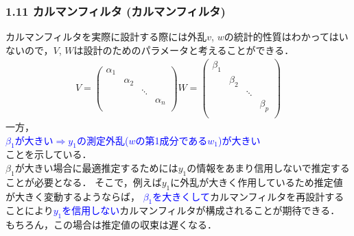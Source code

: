 \documentclass[10pt]{beamer}
\begin{document}
\begin{frame}[t]
\frametitle{1.11 カルマンフィルタ (カルマンフィルタ)}
\addtocounter{equation}{-1}
カルマンフィルタを実際に設計する際には外乱$v$, $w$の統計的性質はわかってはいないので，$V$, $W$は設計のためのパラメータと考えることができる．
\begin{align}
  V =    \left(
      \begin{array}{cccc}
        \alpha_1 & & & \\
        & \alpha_2 & & \\
        & & \ddots & \\
        & & & \alpha_n \\
      \end{array}
    \right)
 
  W =    \left(
      \begin{array}{cccc}
        \beta_1 & & & \\
        & \beta_2 & & \\
        & & \ddots & \\
        & & & \beta_p \\
      \end{array}
    \right)
\end{align}
一方，\\
\textcolor{blue}{$\beta_1$が大きい$\Longrightarrow y_1$の測定外乱($w$の第1成分である$w_1$)が大きい} \\ことを示している．\\
$\beta_1$が大きい場合に最適推定するためには$y_1$の情報をあまり信用しないで推定することが必要となる．
そこで，例えば$y_1$に外乱が大きく作用しているため推定値が大きく変動するようならば，
\textcolor{blue}{$\beta_1$を大きくして}カルマンフィルタを再設計することにより\textcolor{blue}{$y_1$を信用しない}カルマンフィルタが構成されることが期待できる．
もちろん，この場合は推定値の収束は遅くなる．

\end{frame}
\end{document}
